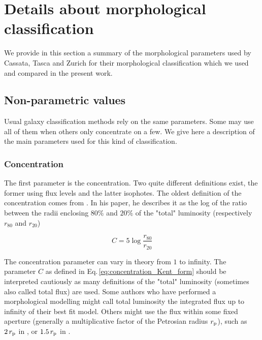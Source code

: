 \clearpage
\section{Details about morphological classification}
\label{appendix:classification}

We provide in this section a summary of the morphological parameters used by Cassata, Tasca and Zurich for their morphological classification which we used and compared in the present work.

\subsection{Non-parametric values}

Usual galaxy classification methods rely on the same parameters. Some may use all of them when others only concentrate on a few. We give here a description of the main parameters used for this kind of classification.

\subsubsection{Concentration}

The first parameter is the concentration. Two quite different definitions exist, the former using flux levels and the latter isophotes. The oldest definition of the concentration comes from . In his paper, he describes it as the log of the ratio between the radii enclosing $80\%$ and $20\%$ of the "total" luminosity (respectively $r_{80}$ and $r_{20}$)

\begin{equation}
	C = 5 \log \frac{r_{80}}{r_{20}}
	\label{eq:concentration_Kent_form}
\end{equation}

The concentration parameter can vary in theory from $1$ to infinity. The parameter $C$ as defined in Eq.\,\ref{eq:concentration_Kent_form} should be interpreted cautiously as many definitions of the "total" luminosity (sometimes also called total flux) are used. Some authors who have performed a morphological modelling might call total luminosity the integrated flux up to infinity of their best fit model. Others might use the flux within some fixed aperture (generally a multiplicative factor of the Petrosian radius $r_{\rm{p}}$), such as $2 \, r_{\rm{p}}$ in , or $1.5 \, r_{\rm{p}}$ in . \\

